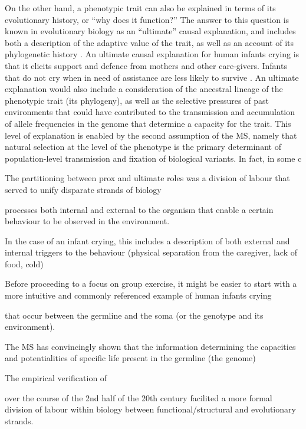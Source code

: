 On the other hand, a phenotypic trait can also be explained in terms of its evolutionary history, or ``why does it function?''  The answer to this question is known in evolutionary biology as an ``ultimate'' causal explanation, and includes both a description of the adaptive value of the trait, as well as an account of its phylogenetic history \citep{Mayr1961,Tinbergen1963}. An ultimate causal explanation for human infants crying is that it elicits support and defence from mothers and other care-givers.  Infants that do not cry when in need of assistance are less likely to survive \citep[38]{Scott-Phillips2011}. An ultimate explanation would also include a consideration of the ancestral lineage of the phenotypic trait (its phylogeny), as well as the selective pressures of past environments that could have contributed to the transmission and accumulation of allele frequencies in the genome that determine a capacity for the trait.  This level of explanation is enabled by the second assumption of the MS, namely that natural selection at the level of the phenotype is the primary determinant of population-level transmission and fixation of biological variants.  In fact, in some c


The partitioning between prox and ultimate roles was a division of labour that served to unify disparate strands of biology

processes both internal and external to the organism that enable a certain behaviour to be observed in the environment.

In the case of an infant crying, this includes a description of both external and internal triggers to the behaviour (physical separation from the caregiver, lack of food, cold)

Before proceeding to a focus on group exercise, it might be easier to start with a more intuitive and commonly referenced example of human infants crying

that occur between the germline and the soma (or the genotype and its environment).

The MS has convincingly shown that the information determining the capacities and potentialities of specific life present in the germline (the genome)



The empirical verification of


over the course of the 2nd half of the 20th century facilited a more formal division of labour within biology between functional/structural and evolutionary strands.




